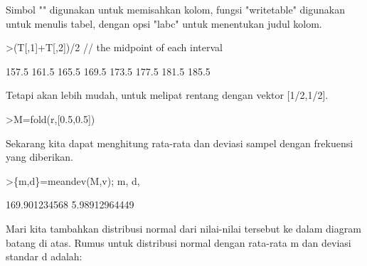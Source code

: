 \documentclass[12pt,arial,letterpaper]{book}
\begin{document}
\begin{eulernootebook}
\begin{eulercomment}
\begin{eulercomment}
\begin{eulernootebook}
\begin{eulercomment}
\begin{eulercomment}
\begin{eulercomment}
\begin{eulercomment}
\begin{eulercomment}
\begin{eulercomment}
\begin{eulercomment}
\begin{eulercomment}
Simbol "\textbar{}" digunakan untuk memisahkan kolom, fungsi "writetable"
digunakan untuk menulis tabel, dengan opsi "labc" untuk menentukan
judul kolom.
\end{eulercomment}
\begin{eulerprompt}
>(T[,1]+T[,2])/2 // the midpoint of each interval
\end{eulerprompt}
\begin{euleroutput}
          157.5 
          161.5 
          165.5 
          169.5 
          173.5 
          177.5 
          181.5 
          185.5 
\end{euleroutput}
\begin{eulercomment}
Tetapi akan lebih mudah, untuk melipat rentang dengan vektor
[1/2,1/2].
\end{eulercomment}
\begin{eulerprompt}
>M=fold(r,[0.5,0.5])
\end{eulerprompt}
\begin{euleroutput}
  [157.5,  161.5,  165.5,  169.5,  173.5,  177.5,  181.5,  185.5]
\end{euleroutput}
\begin{eulercomment}
Sekarang kita dapat menghitung rata-rata dan deviasi sampel dengan
frekuensi yang diberikan.
\end{eulercomment}
\begin{eulerprompt}
>\{m,d\}=meandev(M,v); m, d,
\end{eulerprompt}
\begin{euleroutput}
  169.901234568
  5.98912964449
\end{euleroutput}
\begin{eulercomment}
Mari kita tambahkan distribusi normal dari nilai-nilai tersebut ke
dalam diagram batang di atas. Rumus untuk distribusi normal dengan
rata-rata m dan deviasi standar d adalah:


\end{eulercomment}
\end{eulercomment}
\end{eulercomment}
\end{eulercomment}
\end{eulercomment}
\end{eulercomment}
\end{eulercomment}
\end{eulercomment}
\end{eulernootebook}
\end{eulercomment}
\end{eulercomment}
\end{eulernootebook}
\end{document}
